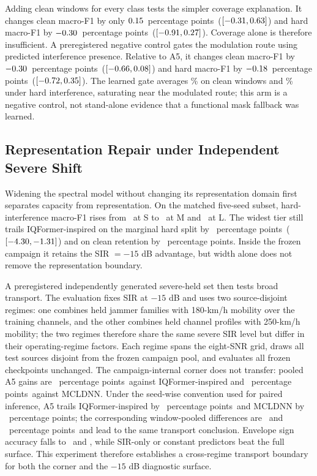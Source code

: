 \documentclass[letterpaper,journal]{IEEEtran}
\newcommand{\pp}{percentage points}
\begin{document}
Adding clean windows for every class tests the simpler coverage explanation.
It changes clean macro-F1 by only $0.15$\ \pp\
($[-0.31,0.63]$) and hard macro-F1 by
$-0.30$\ \pp\ ($[-0.91,0.27]$). Coverage
alone is therefore insufficient. A preregistered negative control gates the
modulation route using predicted interference presence. Relative to A5, it
changes clean macro-F1 by $-0.30$\ \pp\
($[-0.66,0.08]$) and hard
macro-F1 by $-0.18$\ \pp\
($[-0.72,0.35]$). The learned
gate averages \PresenceGateCleanMean\% on clean windows and
\PresenceGateHardMean\% under hard interference, saturating near the modulated
route; this arm is a negative control, not stand-alone evidence
that a functional mask fallback was learned.

\subsection{Representation Repair under Independent Severe Shift}
Widening the spectral model without changing its representation domain first
separates capacity from representation. On the matched five-seed subset,
hard-interference macro-F1 rises from \CapacitySFiveSeedAbs\ at S to
\CapacityMFiveSeedAbs\ at M and \CapacityLFiveSeedAbs\ at L. The widest tier
still trails IQFormer-inspired on the marginal hard split by
\CapacityLHardVsIqformerDiff\ \pp\
($[-4.30,-1.31]$) and on clean
retention by \CapacityLCleanVsIqformerGap\ \pp. Inside the frozen campaign it
retains the SIR $=-15$ dB advantage, but width alone does not remove the
representation boundary.

A preregistered independently generated severe-held set then tests broad
transport. The evaluation fixes SIR at $-15$ dB and uses two source-disjoint
regimes: one combines held jammer families with 180-km/h mobility over the
training channels, and the other combines held channel profiles with
250-km/h mobility; the two regimes therefore share the same severe SIR level
but differ in their operating-regime factors. Each regime spans the eight-SNR
grid, draws all test sources disjoint from the frozen campaign pool, and
evaluates all frozen checkpoints unchanged. The campaign-internal corner does
not transfer: pooled A5 gains are
\SevereTransferGainIqformer\ \pp\ against IQFormer-inspired and
\SevereTransferGainMcldnn\ \pp\ against MCLDNN. Under the seed-wise
convention used for paired inference, A5 trails IQFormer-inspired by
\SevereSeedMeanGapIqformer\ \pp\ and MCLDNN by \SevereSeedMeanGapMcldnn\ \pp;
the corresponding window-pooled differences are \SevereTransferGainIqformer\
and \SevereTransferGainMcldnn\ \pp\ and lead to the same transport conclusion. Envelope sign accuracy falls
to \SevereTransferSignAccIqformer\ and \SevereTransferSignAccMcldnn, while
SIR-only or constant predictors beat the full surface. This experiment
therefore establishes a cross-regime transport boundary for both the corner
and the $-15$ dB diagnostic surface.
\end{document}
